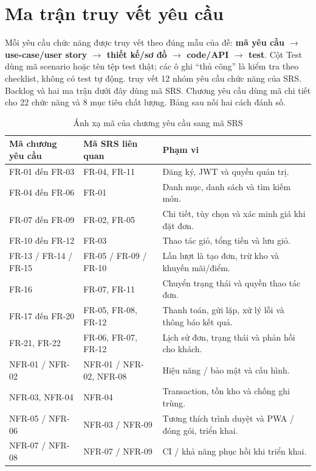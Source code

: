 \section{Ma trận truy vết yêu cầu}

Mỗi yêu cầu chức năng được truy vết theo đúng mẫu của đề: \textbf{mã yêu cầu $\rightarrow$
use-case/user story $\rightarrow$ thiết kế/sơ đồ $\rightarrow$ code/API $\rightarrow$ test}. Cột
Test dùng mã scenario  hoặc tên tệp test thật; các ô ghi ``thủ công'' là kiểm tra
theo checklist, không có test tự động.  truy vết 12 nhóm yêu cầu chức năng
của SRS. Backlog và hai ma trận dưới đây dùng mã SRS. Chương yêu cầu dùng mã
chi tiết cho 22 chức năng và 8 mục tiêu chất lượng. Bảng sau nối hai cách đánh số.

\begin{table}[H]
\centering\small
\caption{Ánh xạ mã của chương yêu cầu sang mã SRS}
\label{tab:doi-chieu-ma}
\begin{tabularx}{\textwidth}{@{}p{3.8cm} p{3.3cm} X@{}}
\toprule
\textbf{Mã chương yêu cầu} & \textbf{Mã SRS liên quan} & \textbf{Phạm vi} \\
\midrule
FR-01 đến FR-03 & FR-04, FR-11 & Đăng ký, JWT và quyền quản trị. \\
FR-04 đến FR-06 & FR-01 & Danh mục, danh sách và tìm kiếm món. \\
FR-07 đến FR-09 & FR-02, FR-05 & Chi tiết, tùy chọn và xác minh giá khi đặt đơn. \\
FR-10 đến FR-12 & FR-03 & Thao tác giỏ, tổng tiền và lưu giỏ. \\
FR-13 / FR-14 / FR-15 & FR-05 / FR-09 / FR-10 & Lần lượt là tạo đơn, trừ kho và khuyến mãi/điểm. \\
FR-16 & FR-07, FR-11 & Chuyển trạng thái và quyền thao tác đơn. \\
FR-17 đến FR-20 & FR-05, FR-08, FR-12 & Thanh toán, gửi lặp, xử lý lỗi và thông báo kết quả. \\
FR-21, FR-22 & FR-06, FR-07, FR-12 & Lịch sử đơn, trạng thái và phản hồi cho khách. \\
\midrule
NFR-01 / NFR-02 & NFR-01 / NFR-02, NFR-08 & Hiệu năng / bảo mật và cấu hình. \\
NFR-03, NFR-04 & NFR-04 & Transaction, tồn kho và chống ghi trùng. \\
NFR-05 / NFR-06 & NFR-03 / NFR-09 & Tương thích trình duyệt và PWA / đóng gói, triển khai. \\
NFR-07 / NFR-08 & NFR-07 / NFR-09 & CI / khả năng phục hồi khi triển khai. \\
\bottomrule
\end{tabularx}
\end{table}

